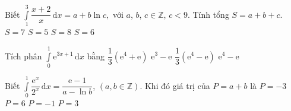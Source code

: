 \begin{ex}%
	Biết $\displaystyle\int\limits_1^3\dfrac{x+2}{x}\mathrm{\,d}x=a+b\ln c,$ với $a$, $b$, $c\in\mathbb{Z}$, $c<9.$ Tính tổng $S=a+b+c.$
	\choice
	{\True $ S=7$}
	{$ S=5$}
	{$ S=8$}
	{$ S=6$}
\end{ex}
%
\begin{ex}%
	Tích phân $\displaystyle\int\limits_0^1\mathrm{e}^{3x+1}\mathrm{\,d}x$ bằng
	\choice
	{$\dfrac{1}{3}\left(\mathrm{e}^4+\mathrm{e}\right)$}
	{$\mathrm{e}^3-\mathrm{e}$}
	{\True $\dfrac{1}{3}\left(\mathrm{e}^4-\mathrm{e}\right)$}
	{$\mathrm{e}^4-\mathrm{e}$}
\end{ex}

\begin{ex}%
	Biết $\displaystyle\int\limits_0^1\dfrac{\mathrm{e}^x}{2^x}\mathrm{\,d}x=\dfrac{\mathrm{e-1}}{a-\ln b }$, $\left(a,b\in\mathbb{Z}\right)$. Khi đó giá trị của $ P=a+b$ là
	\choice
	{$ P=-3$}
	{\True $ P=6$}
	{$ P=-1$}
	{$ P=3$}
\end{ex}

